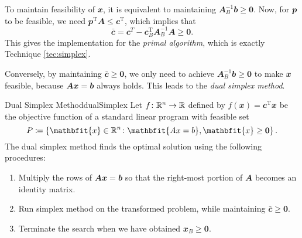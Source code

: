 \documentclass[math, code]{amznotes}
\theoremstyle{remark}
\begin{document}
To maintain feasibility of $\mathbfit{x}$, it is equivalent to maintaining $\mathbfit{A}_B^{-1}\mathbfit{b} \geq \mathbf{0}$. Now, for $\mathbfit{p}$ to be feasible, we need $\mathbfit{p}^{\mathrm{T}}\mathbfit{A} \leq \mathbfit{c}^{\mathrm{T}}$, which implies that
\begin{equation*}
    \bar{\mathbfit{c}} = \mathbfit{c}^{T} - \mathbfit{c}_B^{\mathrm{T}}\mathbfit{A}_B^{-1}\mathbfit{A} \geq \mathbf{0}.
\end{equation*}
This gives the implementation for the \textit{primal algorithm}, which is exactly Technique \ref{tec:simplex}.

Conversely, by maintaining $\bar{\mathbfit{c}} \geq \mathbf{0}$, we only need to achieve $\mathbfit{A}_B^{-1}\mathbfit{b} \geq \mathbf{0}$ to make $\mathbfit{x}$ feasible, because $\mathbfit{Ax} = \mathbfit{b}$ always holds. This leads to the \textit{dual simplex method}.
\begin{tecbox}{Dual Simplex Method}{dualSimplex}
    Let $f \colon \mathbb{R}^n \to \mathbb{R}$ defined by $f(\mathbfit{x}) = \mathbfit{c}^{\mathrm{T}}\mathbfit{x}$ be the objective function of a standard linear program with feasible set 
    \begin{equation*}
        P \coloneqq \left\{\mathbfit{x} \in \R^n \colon \mathbfit{Ax = b}, \mathbfit{x} \geq \mathbf{0}\right\}.
    \end{equation*}
    The dual simplex method finds the optimal solution using the following procedures:
    \begin{enumerate}
        \item Multiply the rows of $\mathbfit{Ax} = \mathbfit{b}$ so that the right-most portion of $\mathbfit{A}$ becomes an identity matrix.
        \item Run simplex method on the transformed problem, while maintaining $\bar{\mathbfit{c}} \geq \mathbf{0}$.
        \item Terminate the search when we have obtained $\mathbfit{x}_B \geq \mathbf{0}$.   
    \end{enumerate}
\end{tecbox}
\end{document}
